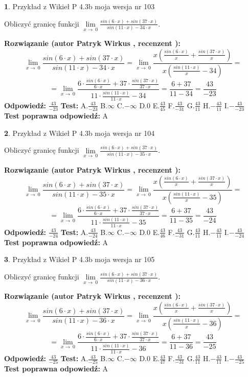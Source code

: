 \documentclass[12pt, a4paper]{article}
\theoremstyle{definition} %
\newtheorem{zad}{}
\newcommand{\zadStart}[1]{\begin{zad}#1\newline}
\newcommand{\zadStop}{\end{zad}}
\newcommand{\rozwStart}[2]{\noindent \textbf{Rozwiązanie (autor #1 , recenzent #2): }\newline}
\newcommand{\rozwStop}{\newline}
\newcommand{\odpStart}{\noindent \textbf{Odpowiedź:}\newline}
\newcommand{\odpStop}{\newline}
\newcommand{\testStart}{\noindent \textbf{Test:}\newline}
\newcommand{\testStop}{\newline}
\newcommand{\kluczStart}{\noindent \textbf{Test poprawna odpowiedź:}\newline}
\newcommand{\kluczStop}{\newline}
\begin{document}
\zadStart{Przykład z Wikieł P 4.3b moja wersja nr 103}


Obliczyć granicę funkcji $\lim\limits_{x\to\ 0}\frac{sin(6 \cdot x)+sin(37 \cdot x)}{sin(11 \cdot x)-34 \cdot x}$.
\zadStop
\rozwStart{Patryk Wirkus}{}
$$\lim\limits_{x\to\ 0}\frac{sin(6 \cdot x)+sin(37 \cdot x)}{sin(11 \cdot x)-34 \cdot x}=\lim\limits_{x\to\ 0}\frac{x(\frac{sin(6 \cdot x)}{x}+\frac{sin(37 \cdot x)}{x})}{x(\frac{sin(11 \cdot x)}{x}-34)}=$$
$$=\lim\limits_{x\to\ 0}\frac{6 \cdot \frac{sin(6 \cdot x)}{6 \cdot x}+37 \cdot \frac{sin(37 \cdot x)}{37 \cdot x}}{11 \cdot \frac{sin(11 \cdot x)}{11 \cdot x}-34}=\frac{6+37}{11-34} = \frac{43}{-23}$$
\rozwStop
\odpStart
$\frac{43}{-23}$
\odpStop
\testStart
A.$\frac{43}{-23}$
B.$\infty$
C.$-\infty$
D.$0$
E.$\frac{43}{45}$
F.$\frac{43}{-31}$
G.$\frac{43}{11}$
H.$-\frac{43}{11}$
I.$-\frac{43}{-23}$
\testStop
\kluczStart
A
\kluczStop



\zadStart{Przykład z Wikieł P 4.3b moja wersja nr 104}


Obliczyć granicę funkcji $\lim\limits_{x\to\ 0}\frac{sin(6 \cdot x)+sin(37 \cdot x)}{sin(11 \cdot x)-35 \cdot x}$.
\zadStop
\rozwStart{Patryk Wirkus}{}
$$\lim\limits_{x\to\ 0}\frac{sin(6 \cdot x)+sin(37 \cdot x)}{sin(11 \cdot x)-35 \cdot x}=\lim\limits_{x\to\ 0}\frac{x(\frac{sin(6 \cdot x)}{x}+\frac{sin(37 \cdot x)}{x})}{x(\frac{sin(11 \cdot x)}{x}-35)}=$$
$$=\lim\limits_{x\to\ 0}\frac{6 \cdot \frac{sin(6 \cdot x)}{6 \cdot x}+37 \cdot \frac{sin(37 \cdot x)}{37 \cdot x}}{11 \cdot \frac{sin(11 \cdot x)}{11 \cdot x}-35}=\frac{6+37}{11-35} = \frac{43}{-24}$$
\rozwStop
\odpStart
$\frac{43}{-24}$
\odpStop
\testStart
A.$\frac{43}{-24}$
B.$\infty$
C.$-\infty$
D.$0$
E.$\frac{43}{46}$
F.$\frac{43}{-31}$
G.$\frac{43}{11}$
H.$-\frac{43}{11}$
I.$-\frac{43}{-24}$
\testStop
\kluczStart
A
\kluczStop



\zadStart{Przykład z Wikieł P 4.3b moja wersja nr 105}


Obliczyć granicę funkcji $\lim\limits_{x\to\ 0}\frac{sin(6 \cdot x)+sin(37 \cdot x)}{sin(11 \cdot x)-36 \cdot x}$.
\zadStop
\rozwStart{Patryk Wirkus}{}
$$\lim\limits_{x\to\ 0}\frac{sin(6 \cdot x)+sin(37 \cdot x)}{sin(11 \cdot x)-36 \cdot x}=\lim\limits_{x\to\ 0}\frac{x(\frac{sin(6 \cdot x)}{x}+\frac{sin(37 \cdot x)}{x})}{x(\frac{sin(11 \cdot x)}{x}-36)}=$$
$$=\lim\limits_{x\to\ 0}\frac{6 \cdot \frac{sin(6 \cdot x)}{6 \cdot x}+37 \cdot \frac{sin(37 \cdot x)}{37 \cdot x}}{11 \cdot \frac{sin(11 \cdot x)}{11 \cdot x}-36}=\frac{6+37}{11-36} = \frac{43}{-25}$$
\rozwStop
\odpStart
$\frac{43}{-25}$
\odpStop
\testStart
A.$\frac{43}{-25}$
B.$\infty$
C.$-\infty$
D.$0$
E.$\frac{43}{47}$
F.$\frac{43}{-31}$
G.$\frac{43}{11}$
H.$-\frac{43}{11}$
I.$-\frac{43}{-25}$
\testStop
\kluczStart
A
\kluczStop
\end{document}
